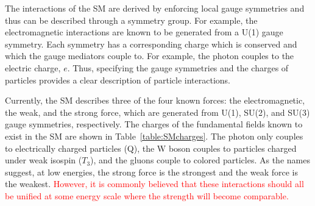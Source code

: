 The interactions of the SM are derived by enforcing local gauge 
symmetries and
thus can be described through a symmetry group.  For example, the 
electromagnetic interactions are known to be generated from a U(1) 
gauge symmetry.  Each symmetry has a corresponding charge which is
conserved and which the gauge mediators couple to. For example,
the photon couples to the electric charge, $e$.
Thus, specifying the gauge symmetries and the charges of particles
provides a clear description of particle interactions.

Currently, the SM describes three of the four known forces: the
electromagnetic, the weak, and the strong force, which are
generated from U(1), SU(2), and SU(3) gauge symmetries,
respectively.  The charges of the fundamental
fields known to exist in the SM are shown in 
Table~\ref{table:SMcharges}.  
The photon only couples to electrically charged
particles (Q), the W boson couples to particles charged under weak 
isospin ($T_3$), 
and the gluons couple to colored particles. As the names 
suggest, at low energies, the strong force is the strongest
and the weak force is the weakest.  \textcolor{red}{However, it
is commonly believed that these interactions
should all be unified at some energy scale where the strength
will become comparable.   }

